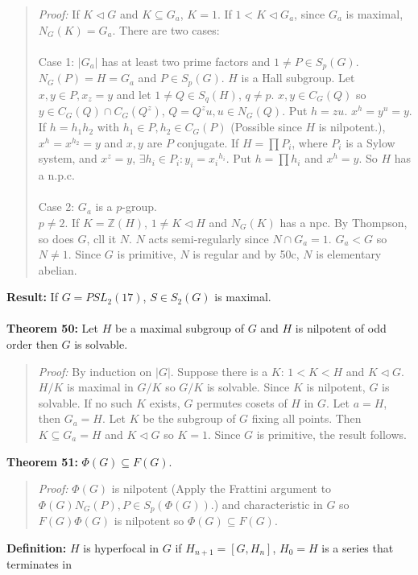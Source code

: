 \begin{quote}
\emph{Proof:}
If $K \lhd G$ and $K \subseteq G_a$, $K = 1$.  If $1 < K \lhd G_a$, since $G_a$ is maximal, $N_G(K)=G_a$.  There
are two cases:\\
\\
Case 1: $|G_a|$ has at least two prime factors and $1 \ne P \in S_p(G)$.\\
$N_G(P)=H=G_a$ and $P \in S_p(G)$.  $H$ is a Hall subgroup.  Let $x, y \in P, x_z=y$ and let $1 \ne Q \in S_q(H)$,
$q \ne p$.  $x, y \in C_G(Q)$ so $y \in C_G(Q) \cap C_G(Q^z)$, $Q=Q^zu, u \in N_G(Q)$.  Put $h =zu$.
$x^h=y^u=y$.  If $h=h_1 h_2$ with $h_1 \in P, h_2 \in C_G(P)$ (Possible since $H$ is nilpotent.), 
$x^h = x^{h_2}= y$ and $x, y$ are $P$ conjugate.  If $H = \prod P_i$, where $P_i$ is a Sylow system, and
$x^z=y$, $\exists h_i \in P_i: y_i = {x_i}^{h_i}$.  Put $h= \prod h_i$ and $x^h=y$. So $H$ has a n.p.c.
\\
\\
Case 2: $G_a$ is a $p$-group.\\
$p \ne 2$.  If $K = {\mathbb Z}(H)$, $1 \ne K \lhd H$ and $N_G(K)$ has a npc.  By Thompson, so does $G$, cll it $N$.
$N$ acts semi-regularly since $N \cap G_a = 1$.  $G_a < G$ so $N \ne 1$. Since $G$ is primitive, $N$ is regular
and by 50c, $N$ is elementary abelian.
\end{quote}
{\bf Result:} If $G= PSL_{2}(17)$, $S \in S_2(G)$ is maximal.
\\
\\
{\bf Theorem 50:} Let $H$ be a maximal subgroup of $G$ and $H$ is nilpotent of odd order then
$G$ is solvable.
\begin{quote}
\emph{Proof:}
By induction on $|G|$. Suppose there is a $K$: $1 < K < H$ and $K \lhd G$.  $H/K$ is maximal in $G/K$
so $G/K$ is solvable.  Since $K$ is nilpotent, $G$ is solvable. If no such $K$ exists, $G$ permutes cosets
of $H$ in $G$.  Let $a = H$, then $G_a = H$.  Let $K$ be the subgroup of $G$ fixing all points.  Then
$K \subseteq G_a = H$ and $K \lhd G$ so $K = 1$.  Since $G$ is primitive, the result follows.
\end{quote}
{\bf Theorem 51:} $\Phi(G) \subseteq F(G)$.
\begin{quote}
\emph{Proof:} $\Phi(G)$ is nilpotent (Apply the Frattini argument to $\Phi(G)N_G(P), P \in S_p(\Phi(G))$.)
and characteristic in $G$ so $F(G)\Phi(G)$ is nilpotent so
$\Phi(G) \subseteq F(G)$.
\end{quote}
{\bf Definition:} $H$ is hyperfocal in $G$ if $H_{n+1} = [G, H_n]$, $H_0 = H$ is a series that terminates in
